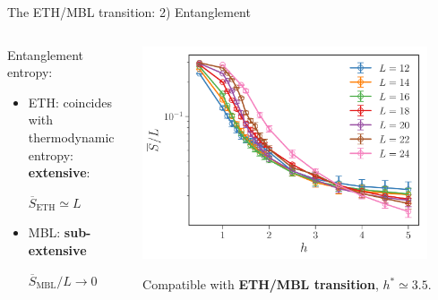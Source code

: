 \begin{frame}{The ETH/MBL transition: 2) Entanglement}
\begin{columns}
\begin{column}{0.5\textwidth}
Entanglement entropy:
\begin{itemize}
	\item ETH: coincides with thermodynamic entropy: \textbf{extensive}:
	
	$\overline{S}_\text{ETH} \simeq L$
	\item MBL: \textbf{sub-extensive}
	
	$\overline{S}_\text{MBL}/L \to 0$
\end{itemize}
\end{column}
\begin{column}{0.5\textwidth}
\centering
\includegraphics[width=0.9\textwidth]{img/3_Fibonacci/entropy}

Compatible with \textbf{ETH/MBL transition}, $h^* \simeq 3.5$.
\end{column}
\end{columns}
\end{frame}

